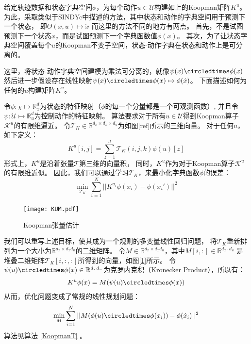 \documentclass[AutoFakeBold]{LZUThesis}
\begin{document}
给定轨迹数据和状态字典空间$\phi$，为每个动作$u \in \mathcal{U}$构建如上的Koopman矩阵$K^u$。
为此，采取类似于SINDYc\cite{brunton_sparse_2016}中描述的方法，其中状态和动作的字典空间用于预测下一个状态，
即$\Theta(x, u) \mapsto \dot x$
而这里的方法不同的地方有两点。
首先，不是试图预测下一个状态$x$，而是试图预测下一个字典函数值$\phi(x)$。
其次，为了让状态字典空间覆盖每个$u$的Koopman不变子空间，状态-动作字典在状态和动作上是可分离的。

这里，将状态-动作字典空间建模为乘法可分离的，就像$\psi(x) \circledtimes \phi(x)$
然后进一步假设存在线性映射$\psi(x) \circledtimes \phi(x) \mapsto \phi(\dot x)$。
下面描述如何为任何的$u$构建矩阵$K^u$。

令$\phi : \chi \mapsto \mathbb{R}^d_x$为状态的特征映射（$\phi$的每一个分量都是一个可观测函数）,
并且令$\psi: \mathcal{U} \mapsto \mathbb{R}^d_u$为控制动作的特征映射。
算法要求对于所有$u \in \mathcal{U}$得到Koopman算子$\mathcal{K}^u$的有限维逼近。
令$\mathcal{T}_{K} \in \mathbb{R}^{d_x \times d_x \times d_u}$为如图[ref]所示的三维向量。
对于任何$u$，如下定义：
\begin{equation}
  K^u[i, j] = \sum_{z = 1}^{d} \mathcal{T}_K (i, j, k) \phi(u)[z]
\end{equation}
形式上，$K^u$是沿着张量$\mathcal{T}$第三维的向量积，
同时，$K^u$作为对于Koopman算子$\mathcal{K}^u$的有限维近似。
因此，我们可以通过学习$\mathcal{T}_K$，来最小化字典函数$\phi$的误差：
\begin{equation}
  \min_{\mathcal{T}_K} \sum_{i = 1}^{N} || K^{u_i} \phi(x_i) - \phi(x_i') ||^2
\end{equation}
\begin{figure}[htbp]
  \centering
  \texttt{[image: KUM.pdf]}
  \caption{Koopman张量估计}
  \label{KUM}
\end{figure}
我们可以重写上述目标，使其成为一个规则的多变量线性回归问题，
将$\mathcal{T}_K$重新排列为一个大小为$\mathbb{R}^{d_x \times d_x d_u}$的二维矩阵。
令$M \in \mathbb{R}^{d_x \times d_x d_u}$，其中$M[i,:] \in \mathbb{R}^{d_x \cdot d_u}$
是堆叠二维矩阵$\mathcal{T}_K[i, :, :]$所得到的向量，如图[\ref{KUM}]所示。
令$\psi(u) \circledtimes \phi(x) \in \mathbb{R}^{d_x d_u}$为克罗内克积（Kronecker Product），所以有：
\begin{equation}
  K^u \phi(x) = M(\psi(u) \circledtimes \phi(x))
\end{equation}
从而，优化问题变成了常规的线性规划问题：
\begin{equation}
  \min_{M} \sum_{i = 1}^{N} || M(\phi(u) \circledtimes \phi(x_i)) - \phi(\dot x_i) ||^2
  \label{solve_M}
\end{equation}
算法见算法 \ref{KoopmanT} 。
\end{document}
